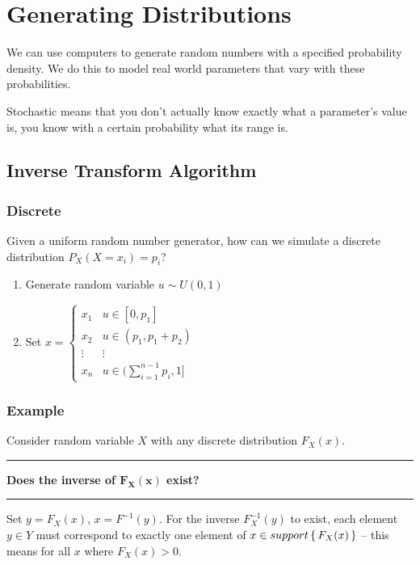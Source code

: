 \documentclass{report}
\newcommand{\ex}{\noindent\rule{\linewidth}{0.2pt}}
\begin{document}
\section{Generating Distributions}

We can use computers to generate random numbers with a specified probability density. We do this to model real world parameters that vary with these probabilities.

Stochastic means that you don't actually know exactly what a parameter's value is, you know with a certain probability what its range is.

\subsection{Inverse Transform Algorithm}

\subsubsection{Discrete}

Given a uniform random number generator, how can we simulate a discrete distribution $P_X(X=x_i)=p_i$?

\begin{enumerate}
\item Generate random variable $u \sim U(0,1)$
\item Set $x = \begin{cases}
x_1 & u \in [0,p_1] \\
x_2 & u \in (p_1, p_1 + p_2) \\
\vdots & \vdots \\
x_n & u \in (\sum_{i=1}^{n-1} p_i, 1]
\end{cases}$
\end{enumerate}

\subsubsection*{Example}

Consider random variable $X$ with any discrete distribution $F_X(x)$.


\ex

\textbf{Does the inverse of $\mathbf{F_X(x)}$ exist?}

\ex

Set $y=F_X(x)$, $x=F^{-1}(y)$. For the inverse $F_X^{-1}(y)$ to exist, each element $y \in Y$ must correspond to exactly one element of $x \in support \set{F_X(x)}$ -- this means for all $x$ where $F_X(x) > 0$.
\end{document}
